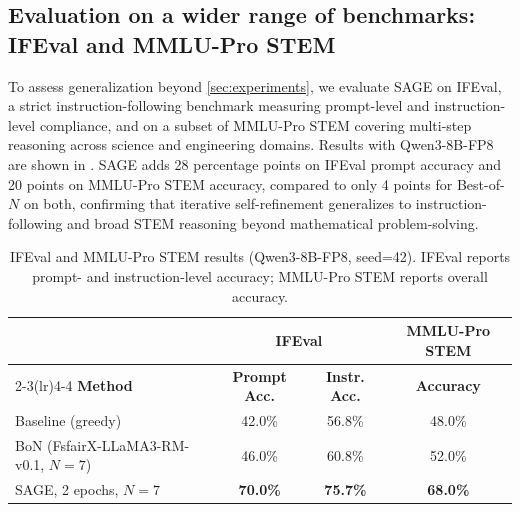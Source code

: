 \documentclass[11pt]{article}
\theoremstyle{plain}
\theoremstyle{definition}
\theoremstyle{remark}
\newcommand{\method}{SAGE}
\begin{document}
\subsection{Evaluation on a wider range of benchmarks: IFEval and MMLU-Pro STEM}

To assess generalization beyond \cref{sec:experiments}, we evaluate \method{} on IFEval, a strict instruction-following benchmark measuring prompt-level and instruction-level compliance, and on a subset of MMLU-Pro STEM covering multi-step reasoning across science and engineering domains. Results with Qwen3-8B-FP8 are shown in . \method{} adds 28 percentage points on IFEval prompt accuracy and 20 points on MMLU-Pro STEM accuracy, compared to only 4 points for Best-of-\(N\) on both, confirming that iterative self-refinement generalizes to instruction-following and broad STEM reasoning beyond mathematical problem-solving.

\begin{table}[h]
\centering
\begin{small}
\begin{sc}
\begin{tabular}{lccc}
\toprule
 & \multicolumn{2}{c}{\textbf{IFEval}} & \textbf{MMLU-Pro STEM} \\
\cmidrule(lr){2-3}\cmidrule(lr){4-4}
\textbf{Method} & \textbf{Prompt Acc.} & \textbf{Instr. Acc.} & \textbf{Accuracy} \\
\midrule
Baseline (greedy)           & 42.0\% & 56.8\% & 48.0\% \\
BoN (FsfairX-LLaMA3-RM-v0.1, $N=7$)        & 46.0\% & 60.8\% & 52.0\% \\
\method{}, 2 epochs, $N=7$  & \textbf{70.0\%} & \textbf{75.7\%} & \textbf{68.0\%} \\
\bottomrule
\end{tabular}
\end{sc}
\end{small}
\caption{IFEval and MMLU-Pro STEM results (Qwen3-8B-FP8, seed=42). IFEval reports prompt- and instruction-level accuracy; MMLU-Pro STEM reports overall accuracy.}
\label{tab:additional-benchmarks}
\end{table}
\end{document}
